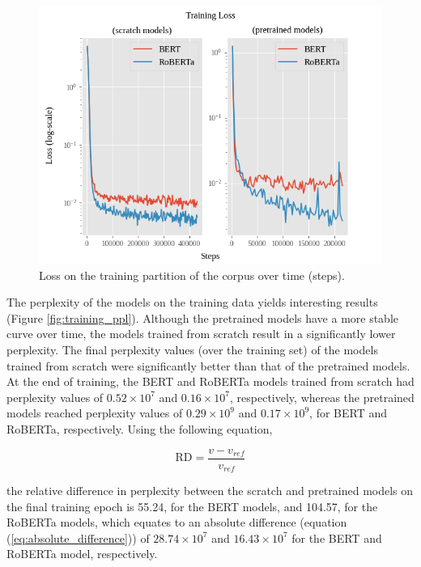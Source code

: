 \documentclass[12pt]{article}
\begin{document}
\begin{figure}[!t]
    \includegraphics[width=\linewidth]{figures/training_loss.png}
    \caption{Loss on the training partition of the corpus over time (steps).}
    \label{fig:training_loss}
\end{figure}

The perplexity of the models on the training data yields interesting results (Figure \ref{fig:training_ppl}). Although the pretrained models have a
more stable curve over time, the models trained from scratch result in a significantly lower perplexity. The final perplexity values (over the
training set) of the models trained from scratch were significantly better than that of the pretrained models. At the end of training, the BERT and
RoBERTa models trained from scratch had perplexity values of $0.52\times 10^7$ and $0.16\times 10^7$, respectively, whereas the pretrained models
reached perplexity values of $0.29\times 10^9$ and $0.17\times 10^9$, for BERT and RoBERTa, respectively. Using the following equation,

\begin{equation}\label{eq:relative_difference}
    \mbox{RD} = \frac{v - v_{ref}}{v_{ref}}
\end{equation}

\noindent
the relative difference in perplexity between the scratch and pretrained models on the final training epoch is 55.24, for the BERT models, and 104.57,
for the RoBERTa models, which equates to an absolute difference (equation (\ref{eq:absolute_difference})) of $28.74 \times 10^7$ and
$16.43 \times 10^7$ for the BERT and RoBERTa model, respectively.
\end{document}
